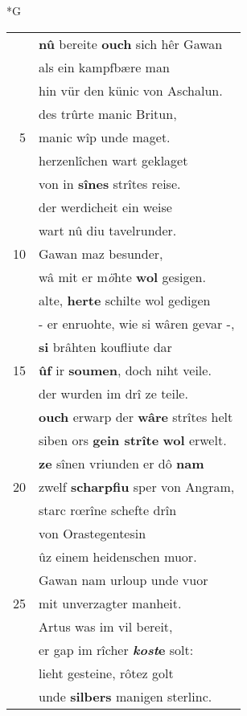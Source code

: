 \documentclass[8pt,a4paper,notitlepage]{article}
\begin{document}
\begin{table}[ht]
\begin{minipage}[t]{0.5\linewidth}
\small
\begin{center}*G
\end{center}
\begin{tabular}{rl}
 & \textbf{nû} bereite \textbf{ouch} sich hêr Gawan\\ 
 & als ein kampfbære man\\ 
 & hin vür den künic von Aschalun.\\ 
 & des trûrte manic Britun,\\ 
5 & manic wîp unde maget.\\ 
 & herzenlîchen wart geklaget\\ 
 & von in \textbf{sînes} strîtes reise.\\ 
 & der werdicheit ein weise\\ 
 & wart nû diu tavelrunder.\\ 
10 & Gawan maz besunder,\\ 
 & wâ mit er m\textit{ö}hte \textbf{wol} gesigen.\\ 
 & alte, \textbf{herte} schilte wol gedigen\\ 
 & - er enruohte, wie si wâren gevar -,\\ 
 & \textbf{si} brâhten koufliute dar\\ 
15 & \textbf{ûf} ir \textbf{soumen}, doch niht veile.\\ 
 & der wurden im drî ze teile.\\ 
 & \textbf{ouch} erwarp der \textbf{wâre} strîtes helt\\ 
 & siben ors \textbf{gein strîte} \textbf{wol} erwelt.\\ 
 & \textbf{ze} sînen vriunden er dô \textbf{nam}\\ 
20 & zwelf \textbf{scharpfiu} sper von Angram,\\ 
 & starc rœrîne schefte drîn\\ 
 & von Orastegentesin\\ 
 & ûz einem heidenschen muor.\\ 
 & Gawan nam urloup unde vuor\\ 
25 & mit unverzagter manheit.\\ 
 & Artus was im vil bereit,\\ 
 & er gap im rîcher \textbf{\textit{kost}e} solt:\\ 
 & lieht gesteine, rôtez golt\\ 
 & unde \textbf{silbers} manigen sterlinc.\\ 

\end{tabular}
\end{minipage}
\end{table}
\end{document}
